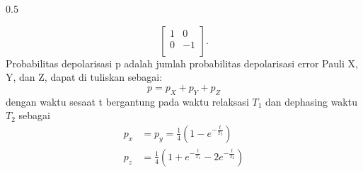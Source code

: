 \begin{frame}
\begin{columns}
\begin{column}{0.5\textwidth}
\begin{itemize}
\begin{equation}
\begin{bmatrix}
                        1 & 0 \\
                        0 & -1 \\
                        \end{bmatrix}.
                    \end{equation}
                Probabilitas depolarisasi p adalah jumlah probabilitas depolarisasi error Pauli X, Y, dan Z, dapat di tuliskan sebagai:
                    \begin{equation}
                        p=p_X+p_Y+p_Z
                    \end{equation}
                dengan waktu sesaat t bergantung pada waktu relaksasi $T_1$ dan dephasing waktu $T_2$ sebagai
                    \begin{equation}
                        \begin{aligned}
                            p_x &= p_y = \frac{1}{4} (1 - e^{-\frac{t}{T_2}}) \\
                            p_z &= \frac{1}{4} (1 + e^{-\frac{t}{T_1}} - 2e^{-\frac{t}{T_2}})
                        \end{aligned}
                    \end{equation}
        \end{itemize}
    \end{column}
    

\end{columns}
\end{frame}
